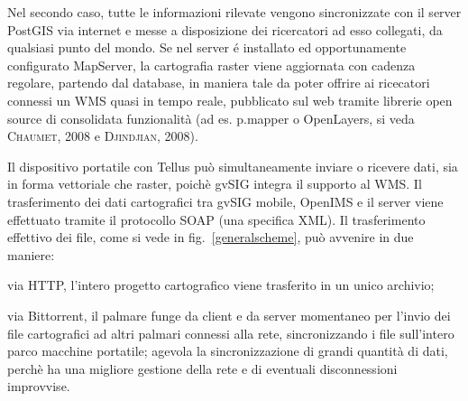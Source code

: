 \documentclass[portrait,final]{baposter}
\begin{document}
\begin{poster}
{	Nel secondo caso, tutte le informazioni rilevate vengono sincronizzate
	con il server PostGIS via internet e messe a disposizione dei ricercatori ad esso
	collegati, da qualsiasi punto del mondo.
	Se nel server \'{e} installato ed opportunamente configurato MapServer,
	la cartografia raster viene aggiornata con cadenza regolare, partendo dal database, in maniera tale da poter offrire ai
	ricecatori connessi un WMS quasi in tempo reale, pubblicato sul web tramite librerie open source
        di consolidata funzionalità (ad es. p.mapper o OpenLayers, si veda \textsc{Chaumet}, 2008 e \textsc{Djindjian}, 2008).

	Il dispositivo portatile con Tellus può simultaneamente inviare o ricevere dati, sia in forma vettoriale che raster, poichè gvSIG integra
	il supporto al WMS. Il trasferimento dei dati cartografici tra gvSIG
	mobile, OpenIMS e il server viene effettuato tramite il protocollo
	SOAP (una specifica XML). Il trasferimento effettivo dei file, come si vede in
	fig.~\ref{generalscheme}, pu\`{o} avvenire in due maniere:
	
	\begin{itemize*}
		\item via HTTP, l'intero progetto cartografico viene trasferito in un unico
			archivio;
		\item via Bittorrent, il palmare funge da client e da server
			momentaneo per l'invio dei file cartografici ad altri palmari connessi
			alla rete, sincronizzando i file sull'intero parco macchine portatile;
			agevola la sincronizzazione di grandi quantità di dati,
			perchè ha una migliore gestione della rete e di eventuali
			disconnessioni improvvise.
	\end{itemize*}
  }

\end{poster}
\end{document}
